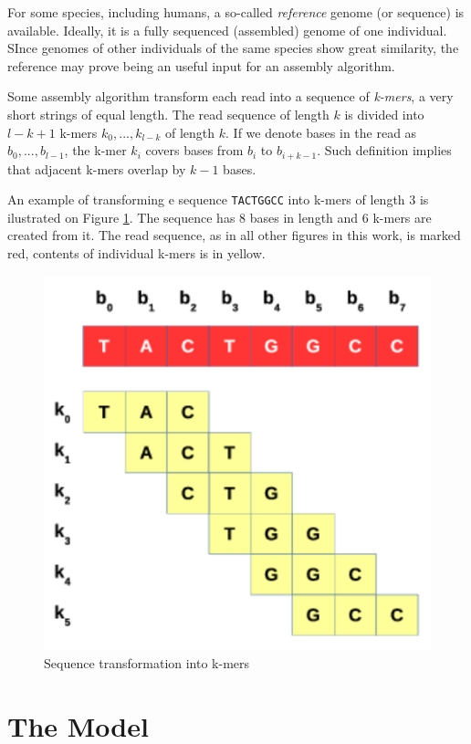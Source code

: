 For some species, including humans, a so-called \textit{reference} genome (or sequence) is available. Ideally, it is a fully sequenced (assembled) genome of one individual. SInce genomes of other individuals of the same species show great similarity, the reference may prove being an useful input for an assembly algorithm. 

Some assembly algorithm transform each read into a sequence of \textit{k-mers}, a very short strings of equal length. The read sequence of length $k$ is divided into $l - k + 1$ k-mers $k_0, ..., k_{l-k}$ of length $k$. If we denote bases in the read as $b_0, ..., b_{l-1}$, the k-mer $k_i$ covers bases from $b_i$ to $b_{i+k-1}$. Such definition implies that adjacent k-mers overlap by $k-1$ bases. 

An example of transforming e sequence \texttt{TACTGGCC} into k-mers of length $3$ is ilustrated on Figure \ref{fig:seq-division}. The sequence has $8$ bases in length and $6$ k-mers are created from it. The read sequence, as in all other figures in this work, is marked red, contents of individual k-mers is in yellow.

\begin{figure}[h]
	\centering
	\includegraphics{img/seq-division.pdf}
	\caption{Sequence transformation into k-mers}
	\label{fig:seq-division}
\end{figure}

\section{The Model}
\label{sec:the-model}

